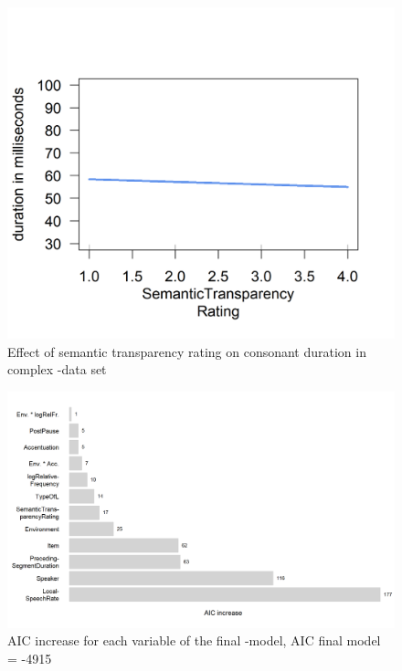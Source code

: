  

 
\begin{figure} [t!]
	\centering
	\includegraphics [scale=0.5] {images/Experiment/LyModelRating}
	\caption{Effect of semantic transparency rating on consonant duration in complex -data set}
	\label{fig: Rating  lyComplex experiment}

\end{figure}





\begin{figure}[b!]
	\centering
		\vspace*{0.8cm}
	\includegraphics[scale=0.7]{images/Experiment/AICdecreaseLYComplex.png}
	\caption{AIC increase for each variable of the final -model, AIC final model = -4915}
	\label{fig:Effect sozed ly compl Exp}

\end{figure}


